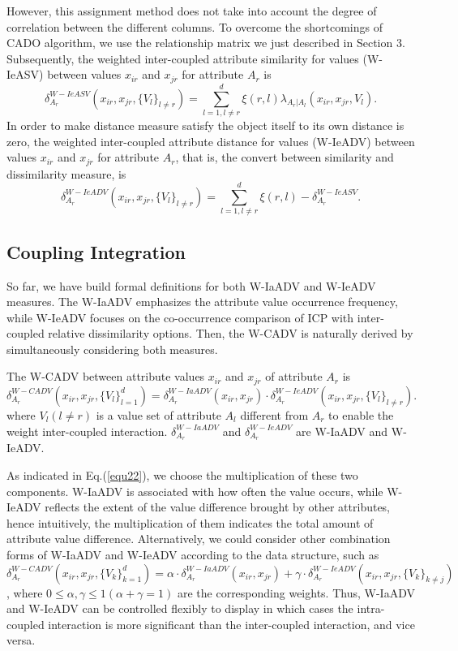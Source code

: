 \documentclass[review]{elsarticle}
\begin{document}
However, this assignment method does not take into account the degree of correlation between the different columns. To overcome the shortcomings of CADO algorithm, we use the relationship matrix we just described in Section 3.
Subsequently, the weighted inter-coupled attribute similarity for values (W-IeASV) between values $x_{ir}$ and $x_{jr}$ for attribute $A_r$ is
\begin{equation}
\delta_{A_r}^{W-IeASV}(x_{ir},x_{jr},\{V_l\}_{l \neq r}) = \sum_{l=1,l \neq r}^{d} \xi(r,l) \lambda_{A_r|A_l}(x_{ir},x_{jr},V_l).
\label{equ20}
\end{equation}
In order to make distance measure satisfy the object itself to its own distance is zero, the weighted inter-coupled attribute distance for values (W-IeADV) between values $x_{ir}$ and $x_{jr}$ for attribute $A_r$, that is, the convert between similarity and dissimilarity measure, is
\begin{equation}
\delta_{A_r}^{W-IeADV}(x_{ir},x_{jr},\{V_l\}_{l \neq r}) = \sum_{l=1,l \neq r}^{d} \xi(r,l) - \delta_{A_r}^{W-IeASV}.
\label{equ21}
\end{equation}

\subsection{Coupling Integration}
So far, we have build formal definitions for both W-IaADV and W-IeADV measures. The W-IaADV emphasizes the attribute value occurrence frequency, while W-IeADV focuses on the co-occurrence comparison of ICP with inter-coupled relative dissimilarity options. Then, the W-CADV is naturally derived by simultaneously considering both measures.

The W-CADV between attribute values $x_{ir}$ and $x_{jr}$ of attribute $A_r$ is
\begin{equation}
\delta_{A_r}^{W-CADV}(x_{ir},x_{jr},\{V_l\}_{l = 1} ^ d) = \delta_{A_r}^{W-IaADV}(x_{ir},x_{jr}) \cdot \delta_{A_r}^{W-IeADV}(x_{ir},x_{jr},\{V_l\}_{l \neq r}).
\label{equ22}
\end{equation}
where $V_l (l \neq r)$ is a value set of attribute $A_l$ different from $A_r$ to enable the weight inter-coupled interaction. $\delta_{A_r}^{W-IaADV}$ and $\delta_{A_r}^{W-IeADV}$ are W-IaADV and W-IeADV.

As indicated in Eq.(\ref{equ22}), we choose the multiplication of these two components. W-IaADV is associated with how often the value occurs, while W-IeADV reflects the extent of the value difference brought by other attributes, hence intuitively, the multiplication of them indicates the total amount of attribute value difference. Alternatively, we could consider other combination forms of W-IaADV and W-IeADV according to the data structure, such as $\delta_{A_r}^{W-CADV}(x_{ir},x_{jr},\{V_k\}_{k = 1} ^ d) = \alpha \cdot \delta_{A_r}^{W-IaADV}(x_{ir},x_{jr}) + \gamma \cdot \delta_{A_r}^{W-IeADV}(x_{ir},x_{jr},\{V_k\}_{k \neq j})$, where $0 \leq \alpha,\gamma \leq 1 (\alpha+\gamma = 1)$
are the corresponding weights. Thus, W-IaADV and W-IeADV can be controlled flexibly to display in which cases the intra-coupled interaction is more significant than the inter-coupled interaction, and vice versa.
\end{document}
